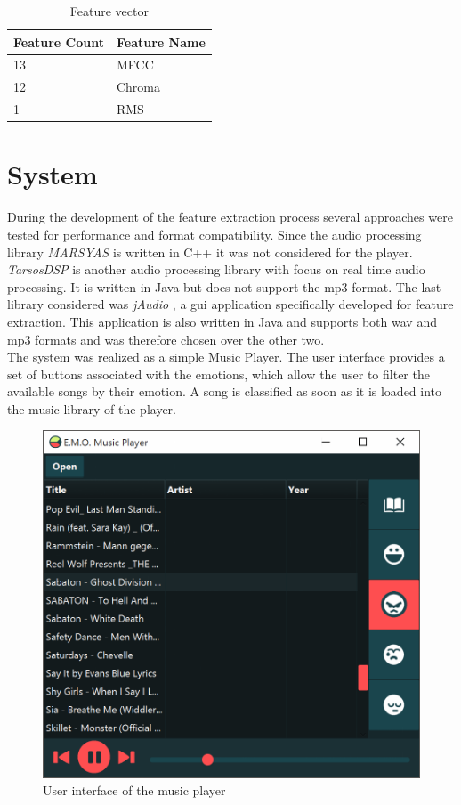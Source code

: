 \documentclass{sigchi-ext}
\begin{document}
\begin{table}
  \centering
  \begin{tabular}{@{}ll@{}}
    Feature Count & Feature Name \\ \midrule
    13 & MFCC \\
    12 & Chroma \\
    1  & RMS
  \end{tabular}
  \caption{Feature vector}
  \label{feature-vector}
\end{table}

\section{System}
During the development of the feature extraction process several approaches were tested for performance and format compatibility. Since the audio processing library \textit{MARSYAS} \cite{Tzanetakis1999} is written in C++ it was not considered for the player. \textit{TarsosDSP} \cite{Six2014} is another audio processing library with focus on real time audio processing. It is written in Java but does not support the mp3 format. The last library considered was \textit{jAudio} \cite{McEnnis2005}, a gui application specifically developed for feature extraction. This application is also written in Java and supports both wav and mp3 formats and was therefore chosen over the other two.\\

The system was realized as a simple Music Player. The user interface provides a set of buttons associated with the emotions, which allow the user to filter the available songs by their emotion. A song is classified as soon as it is loaded into the music library of the player.

\begin{figure}
	\label{screenshot}
	\includegraphics[width=\linewidth]{images/screenshot.png}
	\caption{User interface of the music player}
\end{figure}
\end{document}
